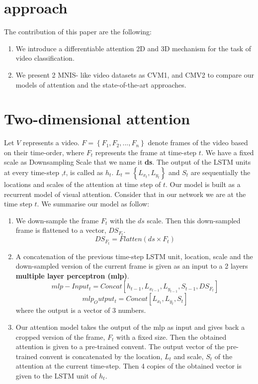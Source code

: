 \documentclass{article} %
\begin{document}
\section{approach}
The contribution of this paper are the following:
\begin{enumerate}
\item We introduce a differentiable attention 2D and 3D mechanism for the task of video classification.
\item We present 2 MNIS- like video datasets as CVM1, and CMV2 to compare our models of attention and the state-of-the-art approaches.
\end{enumerate}
\section{Two-dimensional attention}
Let $V$ represents a video. $F=\left \{ F_{1}, F_{2}, ..., F_{n} \right \}$ denote frames of the video based on their time-order, where $F_{t}$ represents the frame at time-step $t$. We have a fixed scale as Downsampling Scale that we name it \textbf{ds}. The output of the LSTM units at every time-step ,$t$, is called as $h_{t}$. $L_{t}=\left \{ L_{x_{t}},L_{y_{t}} \right \}$ and $S_{t}$ are sequentially the locations and scales of the attention at time step of $t$.
Our model is built as a recurrent model of visual attention. Consider that in our network we are at the time step $t$. We summarise our model as follow:
\begin{enumerate}
\item We down-sample the frame $F_{t}$ with the $ds$ scale. Then this down-sampled frame is flattened to a vector, $DS_{F_{t}}$.
\begin{equation}
DS_{F_{t}}=Flatten(ds\times F_{t})
\end{equation} 
\item A concatenation of the previous time-step LSTM unit, location, scale and the down-sampled version of the current frame is given as an input to a 2 layers \textbf{multiple layer perceptron (mlp)}.
\begin{equation}
mlp-Input_{t}=Concat\left [h_{t-1}, L_{x_{t-1}},L_{y_{t-1}}, S_{t-1}, DS_{F_{t}}\right]
\end{equation} 
\begin{equation}
mlp_Output_{t}=Concat\left [ L_{x_{t}}, L_{y_{t}}, S_{t}\right]
\end{equation}
where the output is a vector of 3 numbers.
\item Our attention model takes the output of the mlp as input and gives back a cropped version of the frame, $F_{t}$ with a fixed size. Then the obtained attention is given to a pre-trained convent. The output vector of the pre-trained convent is concatenated by the location, $L_{t}$ and scale, $S_{t}$ of the attention at the current time-step. Then 4 copies of the obtained vector is given to the LSTM unit of $h_{t}$.
\end{enumerate}
\end{document}
